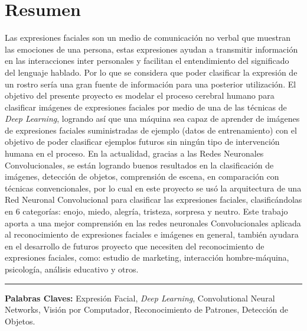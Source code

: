 \chapter*{Resumen}
Las expresiones faciales son un medio de comunicación no verbal que muestran las emociones de una persona, estas expresiones ayudan a transmitir información en las interacciones inter personales y facilitan el entendimiento del significado del lenguaje hablado. Por lo que se considera que poder clasificar la expresión de un rostro sería una gran fuente de información para una posterior utilización. El objetivo del presente proyecto es modelar el proceso cerebral humano para clasificar imágenes de expresiones faciales por medio de una de las técnicas de \textit{Deep Learning}, logrando así que una máquina sea capaz de aprender de imágenes de expresiones faciales suministradas de ejemplo (datos de entrenamiento) con el objetivo de poder clasificar ejemplos futuros sin ningún tipo de intervención humana en el proceso. En la actualidad, gracias a las Redes Neuronales Convolucionales, se están logrando buenos resultados en la clasificación de imágenes, detección de objetos, comprensión de escena, en comparación con técnicas convencionales, por lo cual en este proyecto se usó la arquitectura de una Red Neuronal Convolucional para clasificar las expresiones faciales, clasificándolas en 6 categorías: enojo, miedo, alegría, tristeza, sorpresa y neutro. Este trabajo aporta a una mejor comprensión en las redes neuronales Convolucionales aplicada al reconocimiento de expresiones faciales e imágenes en general, también ayudara en el desarrollo de futuros proyecto que necesiten del reconocimiento de expresiones faciales, como: estudio de marketing, interacción hombre-máquina, psicología, análisis educativo y otros.
\begin{center}
\noindent\rule{16cm}{0.5pt}
\end{center}
\textbf{Palabras Claves:} Expresión Facial, \textit{Deep Learning}, Convolutional Neural Networks, Visión por Computador, Reconocimiento de Patrones, Detección de Objetos.
